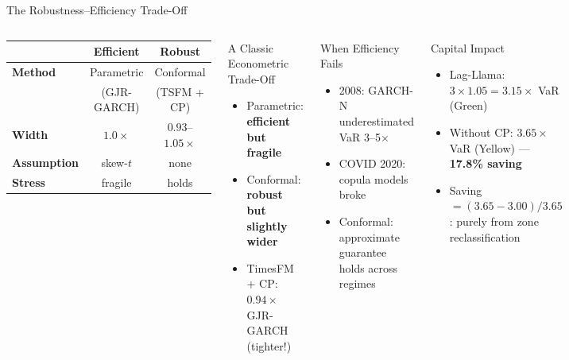 \documentclass[9pt, aspectratio=169, t]{beamer}
\begin{document}
\begin{frame}{The Robustness--Efficiency Trade-Off}
	\vspace{-0.2cm}
	{\footnotesize
	\begin{columns}[T]
		\begin{center}
		{\scriptsize
		\begin{tabular}{@{}l|c|c@{}}
		& \textbf{Efficient} & \textbf{Robust} \\ \hline
		\textbf{Method}  & Parametric & Conformal \\
		                  & (GJR-GARCH) & (TSFM + CP) \\ \hline
		\textbf{Width}   & $1.0\times$ & $0.93$--$1.05\times$ \\
		\textbf{Assumption} & skew-$t$ & none \\
		\textbf{Stress}  & fragile & holds \\
		\end{tabular}
		}
		\end{center}
		\vspace{1mm}
		\begin{block}{A Classic Econometric Trade-Off}
		\begin{itemize}\setlength{\itemsep}{1pt}
			\item Parametric: \textbf{efficient but fragile}
			\item Conformal: \textbf{robust but slightly wider}
			\item TimesFM + CP: $0.94\times$ GJR-GARCH (tighter!)
		\end{itemize}
		\end{block}

		\begin{alertblock}{When Efficiency Fails}
		\begin{itemize}\setlength{\itemsep}{1pt}
			\item 2008: GARCH-N underestimated VaR 3--5$\times$
			\item COVID 2020: copula models broke
			\item Conformal: approximate guarantee holds across regimes
		\end{itemize}
		\end{alertblock}

		\begin{exampleblock}{Capital Impact}
		\begin{itemize}\setlength{\itemsep}{0pt}
			\item Lag-Llama: $3 \times 1.05 = 3.15\times$ VaR (Green)
			\item Without CP: $3.65\times$ VaR (Yellow) --- \textbf{17.8\% saving}
			\item Saving $= (3.65 - 3.00)/3.65$: purely from zone reclassification
		\end{itemize}
		\end{exampleblock}
	\end{columns}
	}
\end{frame}
\end{document}
